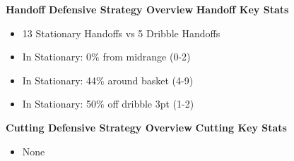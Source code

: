 \documentclass[a4paper,12pt]{article}
\begin{document}
\vspace{1em}

\noindent \textbf{Handoff Defensive Strategy Overview}
\hfill \textbf{Handoff Key Stats}
\begin{table}[H]
    \flushleft
    \hfill
    \begin{minipage}[c]{0.5\textwidth}
        {\small
        \begin{itemize}[rightmargin= 0em, label=\textbullet]
            \item 13 Stationary Handoffs vs 5 Dribble Handoffs \vspace{.5em}

            \item In Stationary: 0\% from midrange (0-2)\vspace{.5em}

            \item In Stationary: 44\% around basket (4-9)\vspace{.5em}

            \item In Stationary: 50\% off dribble 3pt (1-2)\vspace{.5em}
        \end{itemize}
        }
    \end{minipage}
    
\end{table}

\vspace{1em}


\noindent \textbf{Cutting Defensive Strategy Overview}
\hfill \textbf{Cutting Key Stats}
\begin{table}[H]
    \flushleft
    \hfill
    \begin{minipage}[c]{0.5\textwidth}
        {\small
        \begin{itemize}[rightmargin= 0em, label=\textbullet]
            \item None
        \end{itemize}
        }
    \end{minipage}
    
\end{table}
\end{document}
